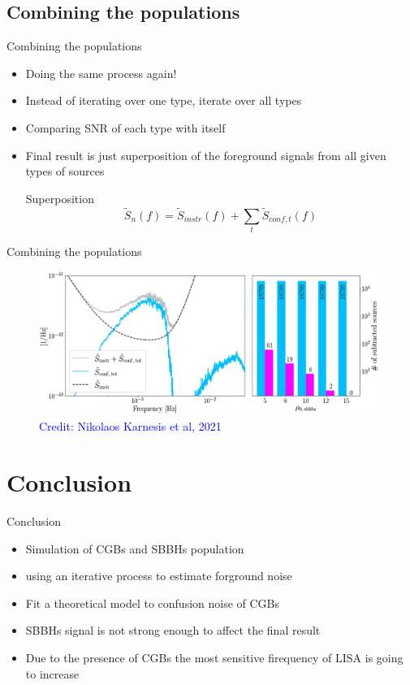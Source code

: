 \documentclass[pdf]{beamer}
\newcommand{\credit}[1]{\tiny{\textcolor{blue}{Credit: #1}}}
\begin{document}
\subsection{Combining the populations}
\begin{frame}{Combining the populations}
\begin{itemize}
\item Doing the same process again!
\item Instead of iterating over one type, iterate over all types
\item Comparing SNR of each type with itself
\item Final result is just superposition of the foreground signals from all given types of sources
\begin{block}{Superposition}
\begin{equation*}
\tilde{S}_n(f) = \tilde{S}_{instr}(f) +\sum_t \tilde{S}_{conf,t}(f)
\end{equation*}
\end{block}
\end{itemize}
\end{frame}

\begin{frame}{Combining the populations}
\begin{figure}
\includegraphics[width=.9\textwidth]{fig/combin.png}
\caption*{\credit{Nikolaos Karnesis et al, 2021}}
\end{figure}
\end{frame}


\section{Conclusion}
\begin{frame}{Conclusion}
\begin{itemize}
\item Simulation of CGBs and SBBHs population
\item using an iterative process to estimate forground noise
\item Fit a theoretical model to confusion noise of CGBs
\item SBBHs signal is not strong enough to affect the final result
\item Due to the presence of CGBs the most sensitive firequency of LISA is going to increase
\end{itemize}
\end{frame}
\end{document}

